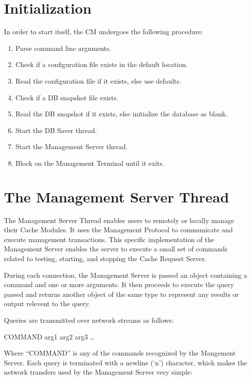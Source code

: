 \documentclass[letterpaper]{article}
\begin{document}
\section{Initialization}
In order to start itself, the CM undergoes the following procedure:

\begin{enumerate}
   \item Parse command line arguments.
   \item Check if a configuration file exists in the default location.
   \item Read the configuration file if it exists, else use defaults.
   \item Check if a DB snapshot file exists.
   \item Read the DB snapshot if it exists, else initialize the database as blank.
   \item Start the DB Saver thread.
   \item Start the Management Server thread.
   \item Block on the Management Terminal until it exits.
\end{enumerate}

\section{The Management Server Thread}
The Management Server Thread enables users to remotely or locally manage their Cache Modules. It uses the Management Protocol to communicate and execute management transactions. This specific implementation of the Management Server enables the server to execute a small set of commands related to testing, starting, and stopping the Cache Request Server.

During each connection, the Management Server is passed an object containing a command and one or more arguments. It then proceeds to execute the query passed and returns another object of the same type to represent any results or output relevent to the query.

Queries are transmitted over network streams as follows:
\\
\begin{addmargin}[1em]{2em}
COMMAND arg1 arg2 arg3 \ldots\\
\end{addmargin}

Where ``COMMAND'' is any of the commands recognized by the Mangement Server. Each query is terminated with a newline (`{\@backslashchar}n') character, which makes the network transfers used by the Management Server very simple:\\
\end{document}
